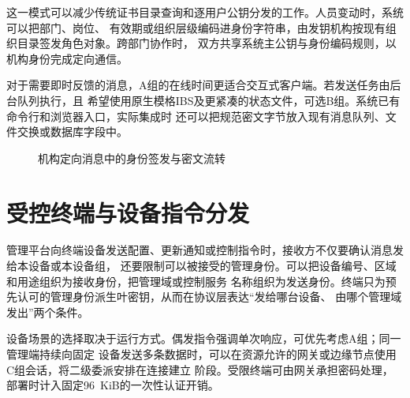 这一模式可以减少传统证书目录查询和逐用户公钥分发的工作。人员变动时，系统可以把部门、岗位、
有效期或组织层级编码进身份字符串，由发钥机构按现有组织目录签发角色对象。跨部门协作时，
双方共享系统主公钥与身份编码规则，以机构身份完成定向通信。

对于需要即时反馈的消息，A组的在线时间更适合交互式客户端。若发送任务由后台队列执行，且
希望使用原生模格IBS及更紧凑的状态文件，可选B组。系统已有命令行和浏览器入口，实际集成时
还可以把规范密文字节放入现有消息队列、文件交换或数据库字段中。

\begin{figure}[H]
\centering
{}
\caption{机构定向消息中的身份签发与密文流转}
\label{fig:institutional-message}
\end{figure}

\section{受控终端与设备指令分发}

管理平台向终端设备发送配置、更新通知或控制指令时，接收方不仅要确认消息发给本设备或本设备组，
还要限制可以被接受的管理身份。可以把设备编号、区域和用途组织为接收身份，把管理域或控制服务
名称组织为发送身份。终端只为预先认可的管理身份派生叶密钥，从而在协议层表达“发给哪台设备、
由哪个管理域发出”两个条件。

设备场景的选择取决于运行方式。偶发指令强调单次响应，可优先考虑A组；同一管理端持续向固定
设备发送多条数据时，可以在资源允许的网关或边缘节点使用C组会话，将二级委派安排在连接建立
阶段。受限终端可由网关承担密码处理，部署时计入固定96~KiB的一次性认证开销。

